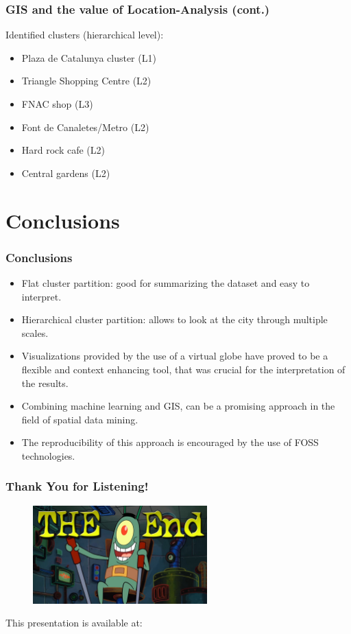 \documentclass[hyperref={pdfpagelabels=true}]{beamer}
\begin{document}
\begin{frame}
\frametitle{GIS and the value of Location-Analysis (cont.)}
    Identified clusters (hierarchical level):
    \begin{itemize}    
      \item<1->Plaza de Catalunya cluster (L1)
      \item<1->Triangle Shopping Centre (L2)
      \item<1->FNAC shop (L3)
      \item<1->Font de Canaletes/Metro (L2)
      \item<1->Hard rock cafe (L2)
      \item<1->Central gardens (L2)
    \end{itemize}
\end{frame}

\section{Conclusions}
\begin{frame}
\frametitle{Conclusions}
    \begin{itemize}    
      \item<2->Flat cluster partition: good for summarizing the dataset and easy to interpret.
      \item<3->Hierarchical cluster partition: allows to look at the city through multiple scales.%
      \item<4->Visualizations provided by the use of a virtual globe have proved to be a flexible and context enhancing tool, that was crucial for the interpretation of the results.
      \item<5->Combining machine learning and GIS, can be a promising approach in the field of spatial data mining.
      \item<6->The reproducibility of this approach is encouraged by the use of FOSS technologies.      
     \end{itemize}
\end{frame}

\begin{frame}
\frametitle{Thank You for Listening!}
    \begin{figure}   
      \includegraphics[width=0.6\textwidth]{end.jpg}      
    \end{figure}   
    This presentation is available at: 
      \vspace{5mm}    
\end{frame}
\end{document}
